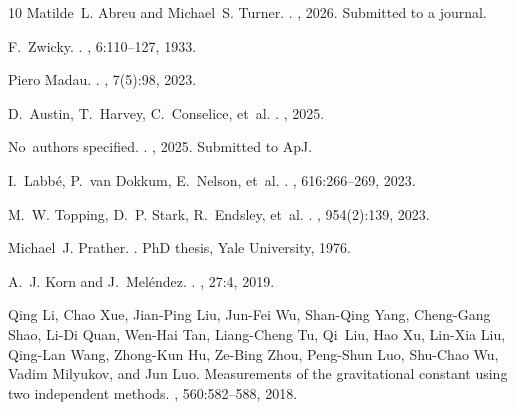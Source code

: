 \documentclass[12pt,leqno]{article}
\begin{document}
\begin{thebibliography}{10}
		Matilde~L. Abreu and Michael~S. Turner.
		.
		, 2026.
		\newblock Submitted to a journal.
		
		F.~Zwicky.
		.
		, 6:110--127, 1933.
		
		Piero Madau.
		.
		, 7(5):98, 2023.
		
		D.~Austin, T.~Harvey, C.~Conselice, et~al.
		.
		, 2025.
		
		No~authors specified.
		.
		, 2025.
		\newblock Submitted to ApJ.
		
		I.~Labbé, P.~van Dokkum, E.~Nelson, et~al.
		.
		, 616:266--269, 2023.
		
		M.~W. Topping, D.~P. Stark, R.~Endsley, et~al.
		.
		, 954(2):139, 2023.
		
		Michael~J. Prather.
		.
		\newblock PhD thesis, Yale University, 1976.
		
		A.~J. Korn and J.~Meléndez.
		.
		, 27:4, 2019.
		
		Qing Li, Chao Xue, Jian-Ping Liu, Jun-Fei Wu, Shan-Qing Yang, Cheng-Gang Shao,
		Li-Di Quan, Wen-Hai Tan, Liang-Cheng Tu, Qi~Liu, Hao Xu, Lin-Xia Liu,
		Qing-Lan Wang, Zhong-Kun Hu, Ze-Bing Zhou, Peng-Shun Luo, Shu-Chao Wu, Vadim
		Milyukov, and Jun Luo.
		\newblock Measurements of the gravitational constant using two independent
		methods.
		, 560:582--588, 2018.
		

\end{thebibliography}
\end{document}
